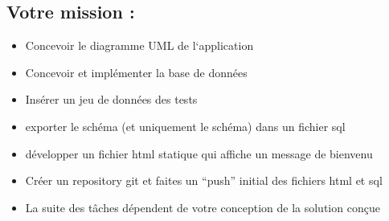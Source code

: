 \subsection{Votre mission :}
\begin{itemize}
\item Concevoir le diagramme UML de l‘application
\item Concevoir et implémenter la base de données
\item Insérer un jeu de données des tests
\item exporter le schéma (et uniquement le schéma) dans un fichier sql
\item développer un fichier html statique qui affiche un message de bienvenu
\item Créer un repository git et faites un “push” initial des fichiers html et sql
\item La suite des tâches dépendent de votre conception de la solution conçue
\end{itemize}
